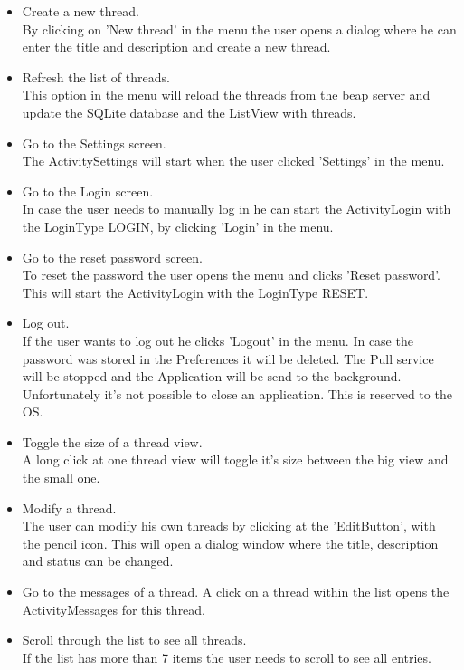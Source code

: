\documentclass[12pt,a4paper,oneside]{report}
\begin{document}
\begin{itemize}
\item{Create a new thread.}\\
By clicking on 'New thread' in the menu the user opens a dialog where he can enter the title and description and create a new thread.

\item{Refresh the list of threads.}\\
This option in the menu will reload the threads from the beap server and update the SQLite database and the ListView with threads.

\item{Go to the Settings screen.}\\
The ActivitySettings will start when the user clicked 'Settings' in the menu.

\item{Go to the Login screen.}\\
In case the user needs to manually log in he can start the ActivityLogin with the LoginType LOGIN, by clicking 'Login' in the menu. 

\item{Go to the reset password screen.}\\
To reset the password the user opens the menu and clicks 'Reset password'. This will start the ActivityLogin with the LoginType RESET.

\item{Log out.}\\
If the user wants to log out he clicks 'Logout' in the menu. In case the password was stored in the Preferences it will be deleted. The Pull service will be stopped and the Application will be send to the background. Unfortunately it's not possible to close an application. This is reserved to the OS.

\item{Toggle the size of  a thread view.}\\
A long click at one thread view will toggle it's size between the big view and the small one.

\item{Modify a thread.}\\
The user can modify his own threads by clicking at the 'EditButton', with the pencil icon. This will open a dialog window where the title, description and status can be changed.

\item{Go to the messages of a thread.}
A click on a thread within the list opens the ActivityMessages for this thread. 

\item{Scroll through the list to see all threads.}\\
If the list has more than 7 items the user needs to scroll to see all entries.

\end{itemize} 
\end{document}
